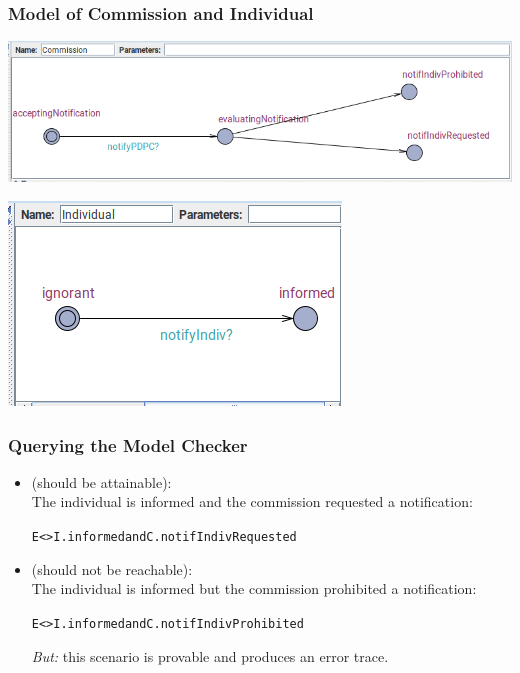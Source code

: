 \documentclass{beamer}
\begin{document}
\begin{frame}[fragile]\frametitle{Model of Commission and Individual}

  \begin{center}
    \includegraphics[scale=0.5]{../Figures/commission.png}
  \end{center}

  \begin{center}
    \includegraphics[scale=0.5]{../Figures/individual.png}
  \end{center}


\end{frame}


\begin{frame}[fragile]\frametitle{Querying the Model Checker}

  \begin{itemize}
  \item {} (should be attainable):\\
    The individual is informed and the commission requested a notification:\\
    \begin{alltt}E<>I.informed and C.notifIndivRequested \end{alltt}
  
  \item {} (should not be reachable):\\
    The individual is informed but the commission prohibited a notification:\\    
    \begin{alltt}E<>I.informed and C.notifIndivProhibited \end{alltt}
    \emph{But:} this scenario is provable and produces an error trace.
\end{itemize}

\end{frame}
\end{document}
